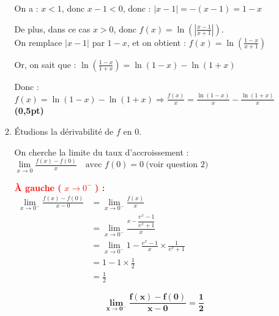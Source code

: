 \documentclass[12pt,a4paper]{article}
\begin{document}
\begin{enumerate}
\begin{enumerate}
                    On a : \( x < 1 \), donc \( x - 1 < 0 \), donc : \( |x - 1| = -(x - 1) = 1 - x \)

                    De plus, dans ce cas \( x > 0 \), donc \( f(x) = \ln\left( \left| \frac{x - 1}{x + 1} \right| \right) \).\\
                    On remplace \( |x - 1| \) par \( 1 - x \), et on obtient : \( f(x) = \ln\left( \frac{1 - x}{x + 1} \right) \)

                    Or, on sait que : \( \ln\left( \frac{1 - x}{1 + x} \right) = \ln(1 - x) - \ln(1 + x) \)

                    Donc : \(     f(x) = \ln(1 - x) - \ln(1 + x) \Rightarrow \frac{f(x)}{x} = \frac{\ln(1 - x)}{x} - \frac{\ln(1 + x)}{x} \) \hfill \textbf{(0,5pt)}

              \item Étudions la dérivabilité de \( f \) en 0.

                    On cherche la limite du taux d’accroissement :\(\lim\limits_{x \to 0} \frac{f(x) - f(0)}{x}
                    \quad \text{avec } f(0) = 0 \ \text{(voir question 2)}\)


                    \textcolor{red}{\textbf{À gauche (} \( x \to 0^- \) \textbf{) :}}\\
                    \(
                    \begin{aligned}
                        \lim\limits_{x \to 0^-} \frac{f(x)-f(0)}{x-0} & = \lim\limits_{x \to 0^-}\frac{f(x)}{x}                                \\
                                                                      & = \lim\limits_{x \to 0^-}\frac{x-\dfrac{e^x - 1}{e^x + 1}}{x}          \\
                                                                      & = \lim\limits_{x \to 0^-}1- \frac{e^x - 1}{x} \times \frac{1}{e^x + 1} \\
                                                                      & =1 - 1 \times\frac{1}{2}                                               \\
                                                                      & =\frac{1}{2}
                    \end{aligned}
                    \)

                    \begin{resultbox}
                        \[
                            \mathbf{\lim\limits_{x \to 0^-} \frac{f(x)-f(0)}{x-0}=\frac{1}{2}}
                        \]
                    \end{resultbox}


\end{enumerate}
\end{enumerate}
\end{document}
